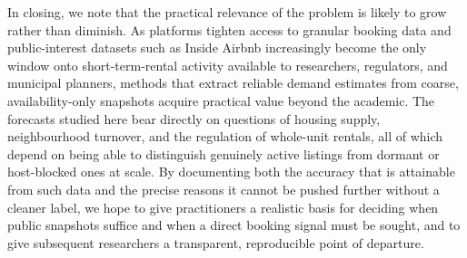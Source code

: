 \documentclass[journal]{IEEEtran}
\begin{document}
In closing, we note that the practical relevance of the problem is likely to grow
rather than diminish. As platforms tighten access to granular booking data and
public-interest datasets such as Inside Airbnb increasingly become the only
window onto short-term-rental activity available to researchers, regulators, and
municipal planners, methods that extract reliable demand estimates from coarse,
availability-only snapshots acquire practical value beyond the academic. The
forecasts studied here bear directly on questions of housing supply, neighbourhood
turnover, and the regulation of whole-unit rentals, all of which depend on being
able to distinguish genuinely active listings from dormant or host-blocked ones at
scale. By documenting both the accuracy that is attainable from such data and the
precise reasons it cannot be pushed further without a cleaner label, we hope to give
practitioners a realistic basis for deciding when public snapshots suffice and when
a direct booking signal must be sought, and to give subsequent researchers a
transparent, reproducible point of departure.


\end{document}
